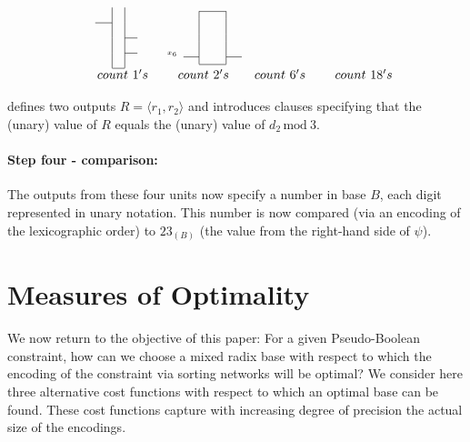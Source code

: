 \documentclass[envcountsame]{llncs}
\newcommand\tuple[1]{\langle #1 \rangle}
\begin{document}
\begin{wrapfigure}{r}{83mm}
\[\begin{array}{cccc}
\begin{array}{ll|l|l}
            & ~ & & \\
          \cline{2-2} 
            & ~ & & \\
                  \cline{4-4}
            & ~ & &\\
                  \cline{4-4}
            & & &\\
      \cline{3-3}  
    \end{array}
~~& \tiny    \begin{array}{ll|l|l}
      \cline{3-3} 
          & ~ &\hspace{4mm} & ~\\
& ~ &\hspace{4mm} & ~\\
&   &             &  \\
& ~ & &\\
& ~ & &\\
x_6 & ~ & &\\
        \cline{2-2} \cline{4-4} 
          & & & \\
      \cline{3-3}  
    \end{array}

\\[5mm]
~~~~count~1's & ~count~2's & count~6's& ~~~~count~18's 
\end{array}
\]
\vspace{-14mm}\end{wrapfigure}
defines two
outputs $R=\tuple{r_1,r_2}$ and introduces clauses specifying that the
(unary) value of $R$ equals the (unary) value of $d_2\, \mathrm{mod~}
3$. 


\paragraph{\textbf{Step four - comparison:}}
The outputs from these four units now specify a number in base $B$,
each digit represented in unary notation. This number is now compared
(via an encoding of the lexicographic order) to $23_{(B)}$ (the value
from the right-hand side of $\psi$).



\section{Measures of Optimality}
\label{section:4}

We now return to the objective of this paper: For a given
Pseudo-Boolean constraint, how can we choose a mixed radix base with
respect to which the encoding of the constraint via sorting networks
will be optimal? We consider here three alternative cost functions
with respect to which an optimal base can be found.  These cost
functions capture with increasing degree of precision the actual size
of the encodings.
\end{document}
